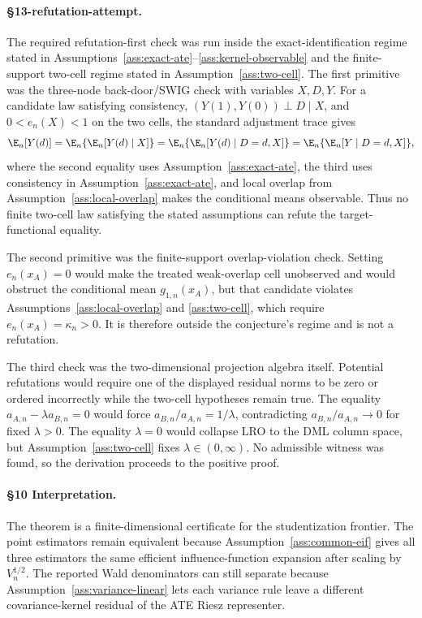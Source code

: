 \paragraph{\S13-refutation-attempt.}
The required refutation-first check was run inside the exact-identification regime stated in Assumptions~\ref{ass:exact-ate}--\ref{ass:kernel-observable} and the finite-support two-cell regime stated in Assumption~\ref{ass:two-cell}.  The first primitive was the three-node back-door/SWIG check with variables \(X,D,Y\).  For a candidate law satisfying consistency, \((Y(1),Y(0))\perp D\mid X\), and \(0<e_n(X)<1\) on the two cells, the standard adjustment trace gives
\[
  \E_n[Y(d)]
  =\E_n\{\E_n[Y(d)\mid X]\}
  =\E_n\{\E_n[Y(d)\mid D=d,X]\}
  =\E_n\{\E_n[Y\mid D=d,X]\},
\]
where the second equality uses Assumption~\ref{ass:exact-ate}, the third uses consistency in Assumption~\ref{ass:exact-ate}, and local overlap from Assumption~\ref{ass:local-overlap} makes the conditional means observable.  Thus no finite two-cell law satisfying the stated assumptions can refute the target-functional equality.

The second primitive was the finite-support overlap-violation check.  Setting \(e_n(x_A)=0\) would make the treated weak-overlap cell unobserved and would obstruct the conditional mean \(g_{1,n}(x_A)\), but that candidate violates Assumptions~\ref{ass:local-overlap} and \ref{ass:two-cell}, which require \(e_n(x_A)=\kappa_n>0\).  It is therefore outside the conjecture's regime and is not a refutation.

The third check was the two-dimensional projection algebra itself.  Potential refutations would require one of the displayed residual norms to be zero or ordered incorrectly while the two-cell hypotheses remain true.  The equality \(a_{A,n}-\lambda a_{B,n}=0\) would force \(a_{B,n}/a_{A,n}=1/\lambda\), contradicting \(a_{B,n}/a_{A,n}\to0\) for fixed \(\lambda>0\).  The equality \(\lambda=0\) would collapse LRO to the DML column space, but Assumption~\ref{ass:two-cell} fixes \(\lambda\in(0,\infty)\).  No admissible witness was found, so the derivation proceeds to the positive proof.

\paragraph{\S10 Interpretation.}
The theorem is a finite-dimensional certificate for the studentization frontier.  The point estimators remain equivalent because Assumption~\ref{ass:common-eif} gives all three estimators the same efficient influence-function expansion after scaling by \(V_n^{1/2}\).  The reported Wald denominators can still separate because Assumption~\ref{ass:variance-linear} lets each variance rule leave a different covariance-kernel residual of the ATE Riesz representer.

